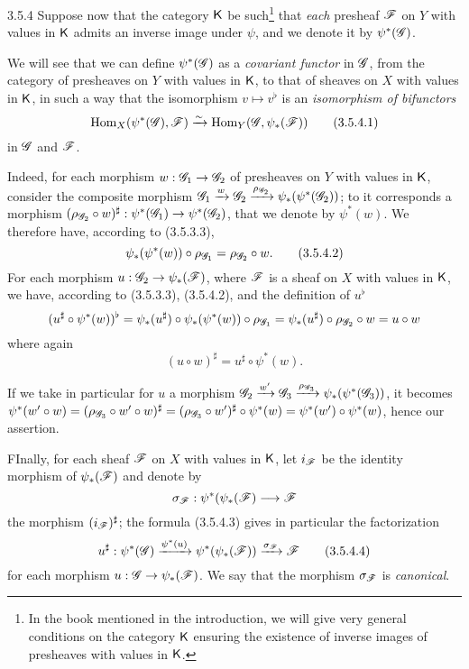 \begin{env}{3.5.4}
\label{env-0.3.5.4}
Suppose now that the category $\mathsf{K}$ be such\footnote{In the book mentioned in the
introduction, we will give very general conditions on the category $\mathsf{K}$ ensuring the
existence of inverse images of presheaves with values in $\mathsf{K}$.} that \emph{each} presheaf
$\mathscr{F}$ on $Y$ with values in $\mathsf{K}$ admits an inverse image under $\psi$, and we denote it
by $\psi^*(\mathscr{G})$.

We will see that we can define $\psi^*(\mathscr{G})$ as a \emph{covariant functor} in $\mathscr{G}$,
from the category of presheaves on $Y$ with values in $\mathsf{K}$, to that of sheaves on $X$ with
values in $\mathsf{K}$, in such a way that the isomorphism $v\mapsto v^\flat$ is an \emph{isomorphism
of bifunctors}
\[
  {\mathop{\mathrm{Hom}}\nolimits}_X(\psi^*(\mathscr{G}),\mathscr{F})\xrightarrow{\sim}{\mathop{\mathrm{Hom}}\nolimits}_Y(\mathscr{G},\psi_*(\mathscr{F}))
  \tag{3.5.4.1}
\]
in $\mathscr{G}$ and $\mathscr{F}$.

Indeed, for each morphism $w:\mathscr{G}_1\to\mathscr{G}_2$ of presheaves on $Y$ with values in $\mathsf{K}$,
consider the composite morphism
$\mathscr{G}_1\xrightarrow{w}\mathscr{G}_2\xrightarrow{\rho_{\mathscr{G}_2}}\psi_*(\psi^*(\mathscr{G}_2))$; to it
corresponds a morphism $(\rho_{\mathscr{G}_2}\circ w)^\sharp:\psi^*(\mathscr{G}_1)\to\psi^*(\mathscr{G}_2)$,
that we denote by $\psi^*(w)$. We therefore have, according to (3.5.3.3),
\[
  \psi_*(\psi^*(w))\circ\rho_{\mathscr{G}_1}=\rho_{\mathscr{G}_2}\circ w.
  \tag{3.5.4.2}
\]
For each morphism $u:\mathscr{G}_2\to\psi_*(\mathscr{F})$, where $\mathscr{F}$ is a sheaf on $X$ with values
in $\mathsf{K}$, we have, according to (3.5.3.3), (3.5.4.2), and the definition of $u^\flat$
\[
  (u^\sharp\circ\psi^*(w))^\flat=\psi_*(u^\sharp)\circ\psi_*(\psi^*(w))\circ\rho_{\mathscr{G}_1}
  =\psi_*(u^\sharp)\circ\rho_{\mathscr{G}_2}\circ w=u\circ w
\]
where again
\[
  (u\circ w)^\sharp=u^\sharp\circ\psi^*(w).
  \tag{3.5.4.3}
\]

If we take in particular for $u$ a morphism
$\mathscr{G}_2\xrightarrow{w'}\mathscr{G}_3\xrightarrow{\rho_{\mathscr{G}_3}}\psi_*(\psi^*(\mathscr{G}_3))$, it
becomes
$\psi^*(w'\circ w)=(\rho_{\mathscr{G}_3}\circ w'\circ w)^\sharp
=(\rho_{\mathscr{G}_3}\circ w')^\sharp\circ\psi^*(w)=\psi^*(w')\circ\psi^*(w)$, hence our
assertion.

FInally, for each sheaf $\mathscr{F}$ on $X$ with values in $\mathsf{K}$, let $i_\mathscr{F}$ be the identity
morphism of $\psi_*(\mathscr{F})$ and denote by
\[
  \sigma_\mathscr{F}:\psi^*(\psi_*(\mathscr{F})\longrightarrow\mathscr{F}
\]
the morphism $(i_\mathscr{F})^\sharp$; the formula (3.5.4.3) gives in particular the factorization
\[
  u^\sharp:\psi^*(\mathscr{G})\xrightarrow{\psi^*(u)}\psi^*(\psi_*(\mathscr{F}))
  \xrightarrow{\sigma_\mathscr{F}}\mathscr{F}
  \tag{3.5.4.4}
\]
for each morphism $u:\mathscr{G}\to\psi_*(\mathscr{F})$. We say that the morphism $\sigma_\mathscr{F}$ is
\emph{canonical}.
\end{env}

